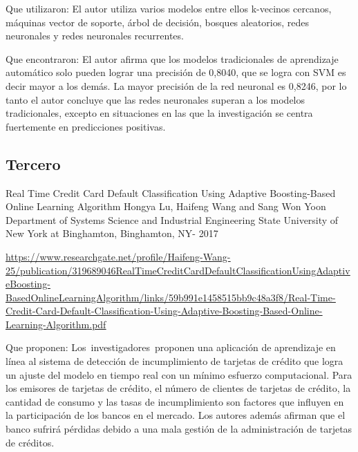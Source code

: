 \documentclass[12pt]{report}
\renewcommand{\_}{\kern-1.5pt\textunderscore\kern-1.5pt}
\begin{document}
\vspace{\baselineskip}
Que utilizaron:
El autor utiliza varios modelos entre ellos k-vecinos cercanos, máquinas vector de soporte, árbol de decisión, bosques aleatorios, redes neuronales y redes neuronales recurrentes.

\vspace{\baselineskip}

\vspace{\baselineskip}
Que encontraron:
El autor afirma que los modelos tradicionales de aprendizaje automático solo pueden lograr una precisión de 0,8040, que se logra con SVM es decir mayor a los demás. La mayor precisión de la red neuronal es 0,8246, por lo tanto el autor concluye que las redes neuronales superan a los modelos tradicionales, excepto en situaciones en las que la investigación se centra fuertemente en predicciones positivas.

\vspace{\baselineskip}
\subsection{Tercero}
Real Time Credit Card Default Classification Using Adaptive Boosting-Based Online Learning Algorithm
Hongya Lu, Haifeng Wang and Sang Won Yoon Department of Systems Science and Industrial Engineering State University of New York at Binghamton, Binghamton, NY- 2017

\vspace{\baselineskip}
\href{https://www.researchgate.net/profile/Haifeng-Wang-25/publication/319689046_Real_Time_Credit_Card_Default_Classification_Using_Adaptive_Boosting-Based_Online_Learning_Algorithm/links/59b991e1458515bb9c48a3f8/Real-Time-Credit-Card-Default-Classification-Using-Adaptive-Boosting-Based-Online-Learning-Algorithm.pdf}{\textcolor[HTML]{1155CC}{\ul{https://www.researchgate.net/profile/Haifeng-Wang-25/publication/319689046\_Real\_Time\_Credit\_Card\_Default\_Classification\_Using\_Adaptive\_Boosting-Based\_Online\_Learning\_Algorithm/links/59b991e1458515bb9c48a3f8/Real-Time-Credit-Card-Default-Classification-Using-Adaptive-Boosting-Based-Online-Learning-Algorithm.pdf}}}

\vspace{\baselineskip}
Que proponen: 
Los\ investigadores\  proponen una aplicación de aprendizaje en línea al sistema de detección de incumplimiento de tarjetas de crédito que logra un ajuste del modelo en tiempo real con un mínimo esfuerzo computacional. Para los emisores de tarjetas de crédito, el número de clientes de tarjetas de crédito, la  cantidad de consumo y las tasas de incumplimiento son factores que influyen en la participación de los bancos en el mercado. Los autores además afirman que el banco sufrirá pérdidas debido a una mala gestión de la administración de tarjetas de créditos.
\end{document}
